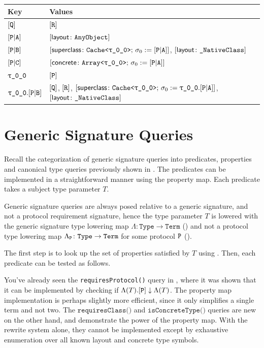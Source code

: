 \documentclass[../generics]{subfiles}
\begin{document}
\begin{example}
\begin{table}\label{propmapexample3table}
\begin{center}
\begin{tabular}{|l|l|}
\hline
Key&Values\\
\hline
\hline
$[\texttt{Q}]$&$[\texttt{R}]$\\
$[\texttt{P}|\texttt{A}]$&$[\mathsf{layout}\colon\texttt{AnyObject}]$\\
$[\texttt{P}|\texttt{B}]$&$\supersym{\texttt{Cache<\rT>};\,\sigma_0:=\assocsym{P}{A}}$, $[\mathsf{layout}\colon\texttt{\_NativeClass}]$\\
$[\texttt{P}|\texttt{C}]$&$\concretesym{\texttt{Array<\rT>};\,\sigma_0:=\assocsym{P}{A}}$\\
$\rT$&$[\texttt{P}]$\\
$\rT.\assocsym{P}{B}$&$[\texttt{Q}]$, $[\texttt{R}]$, $\supersym{\texttt{Cache<\rT>};\,\sigma_0:=\rT.\assocsym{P}{A}}$, $[\mathsf{layout}\colon\texttt{\_NativeClass}]$\\
\hline
\end{tabular}
\end{center}
\end{table}
\end{example}

\section{Generic Signature Queries}\label{implqueries}

Recall the categorization of generic signature queries into predicates, properties and canonical type queries previously shown in . The predicates can be implemented in a straightforward manner using the property map. Each predicate takes a subject type parameter $T$.

Generic signature queries are always posed relative to a generic signature, and not a protocol requirement signature, hence the type parameter $T$ is lowered with the generic signature type lowering map $\Lambda\colon\texttt{Type}\rightarrow\texttt{Term}$ () and not a protocol type lowering map $\Lambda_{\texttt{P}}\colon\texttt{Type}\rightarrow\texttt{Term}$ for some protocol $\texttt{P}$ ().

The first step is to look up the set of properties satisfied by $T$ using . Then, each predicate can be tested as follows.

You've already seen the \texttt{requiresProtocol()} query in , where it was shown that it can be implemented by checking if $\Lambda(T).[\texttt{P}]\downarrow\Lambda(T)$. The property map implementation is perhaps slightly more efficient, since it only simplifies a single term and not two. The $\texttt{requiresClass()}$ and $\texttt{isConcreteType()}$ queries are new on the other hand, and demonstrate the power of the property map. With the rewrite system alone, they cannot be implemented except by exhaustive enumeration over all known layout and concrete type symbols.
\end{document}
